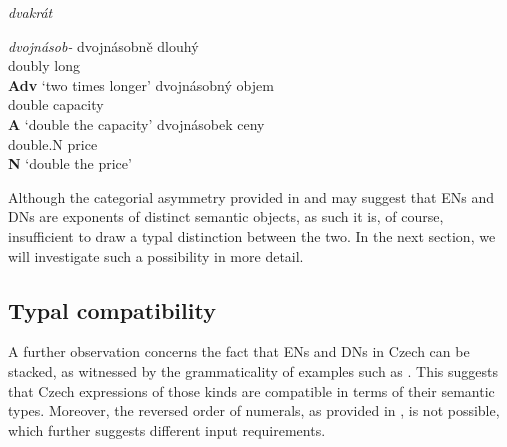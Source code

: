 \documentclass[output=paper,
modfonts,
hidelinks,
newtxmath
]{langscibook}
\begin{document}
\begin{multicols}{2}
\ea \textit{dvakrát}\label{dvakrat-morphology}

\z
\z
\columnbreak
%
\ea \textit{dvojnásob-}\label{dvojnasobne-morphology} 
\ea \gll dvojnásobně dlouhý\\
doubly long\\\hfill\textbf{Adv}
\glt `two times longer'
\ex \gll dvojnásobný objem\\
double capacity\\\hfill\textbf{A}
\glt `double the capacity'
\ex \gll dvojnásobek ceny\\
double.N price\\\hfill\textbf{N}
\glt `double the price'
\z \z

\end{multicols}
\vspace{3mm}

\noindent Although the categorial asymmetry provided in  and  may suggest that ENs and DNs are exponents of distinct semantic objects, as such it is, of course, insufficient to draw a typal distinction between the two. In the next section, we will investigate such a possibility in more detail.

\subsection{Typal compatibility}\label{typal-compatibility}

A further observation concerns the fact that ENs and DNs in Czech can be stacked, as witnessed by the grammaticality of examples such as . This suggests that Czech expressions of those kinds are compatible in terms of their semantic types. Moreover, the reversed order of numerals, as provided in , is not possible, which further suggests different input requirements.
\end{document}
